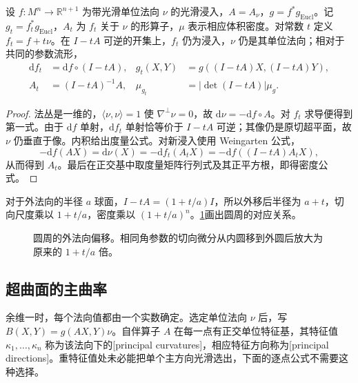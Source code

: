 \begin{proposition}\label{g3:prop:parallel-hypersurface}
	设 \(f:M^n\to\mathbb R^{n+1}\) 为带光滑单位法向 \(\nu\) 的光滑浸入，\(A=A_\nu\)，\(g=f^*g_{\mathrm{Eucl}}\)。记 \(g_t=f_t^*g_{\mathrm{Eucl}}\)，\(A_t\) 为 \(f_t\) 关于 \(\nu\) 的形算子，\(\mu\) 表示相应体积密度。对常数 \(t\) 定义 \(f_t=f+t\nu\)。在 \(I-tA\) 可逆的开集上，\(f_t\) 仍为浸入，\(\nu\) 仍是其单位法向；相对于共同的参数流形，
	\begin{align}
		\mathrm df_t&=\mathrm df\circ(I-tA),
		&g_t(X,Y)&=g((I-tA)X,(I-tA)Y),\label{g3:eq:parallel-hypersurface-metric}\\
		A_t&=(I-tA)^{-1}A,
		&\mu_{g_t}&=|\det(I-tA)|\mu_g.\label{g3:eq:parallel-hypersurface-shape}
	\end{align}
\end{proposition}
\begin{proof}
	法丛是一维的，\(\langle\nu,\nu\rangle=1\) 使 \(\nabla^\perp\nu=0\)，故 \(\mathrm d\nu=-\mathrm df\circ A\)。对 \(f_t\) 求导便得到第一式。由于 \(\mathrm df\) 单射，\(\mathrm df_t\) 单射恰等价于 \(I-tA\) 可逆；其像仍是原切超平面，故 \(\nu\) 仍垂直于像。内积给出度量公式。对新浸入使用 Weingarten 公式，
	\[
		-\mathrm df(A X)=\mathrm d\nu(X)
		=-\mathrm df_t(A_tX)
		=-\mathrm df((I-tA)A_tX),
	\]
	从而得到 \(A_t\)。最后在正交基中取度量矩阵行列式及其正平方根，即得密度公式。
\end{proof}

对于外法向的半径 \(a\) 球面，\(I-tA=(1+t/a)I\)，所以外移后半径为 \(a+t\)，切向尺度乘以 \(1+t/a\)，密度乘以 \((1+t/a)^n\)。\cref{g3:fig:normal-offset}画出圆周的对应关系。

\begin{figure}[htbp]
	\centering
	
	\caption[圆周的法向偏移]{圆周的外法向偏移。相同角参数的切向微分从内圆移到外圆后放大为原来的 \(1+t/a\) 倍。}
	\label{g3:fig:normal-offset}
\end{figure}

\subsection{超曲面的主曲率}
\label{g3:subsec:0404:02}

余维一时，每个法向值都由一个实数确定。选定单位法向 \(\nu\) 后，写 \(B(X,Y)=g(AX,Y)\nu\)。自伴算子 \(A\) 在每一点有正交单位特征基，其特征值 \(\kappa_1,\ldots,\kappa_n\) 称为该法向下的[principal curvatures]，相应特征方向称为[principal directions]。重特征值处未必能把单个主方向光滑选出，下面的逐点公式不需要这种选择。

